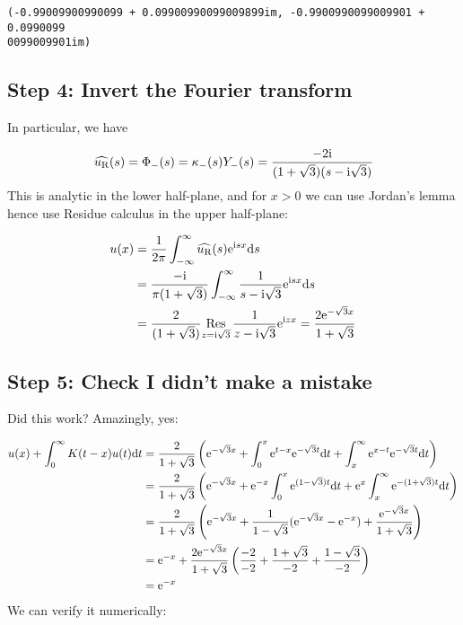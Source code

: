 \documentclass[12pt,a4paper]{article}
\def\D{ {\rm d} }
\def\I{ {\rm i} }
\def\E{ {\rm e} }
\def\Res_#1{\underset{#1}{\rm Res}\,}
\def\dt{\D t}
\def\ds{\D s}
\begin{document}
\begin{lstlisting}
(-0.99009900990099 + 0.09900990099009899im, -0.9900990099009901 + 0.0990099
0099009901im)
\end{lstlisting}


\subsection{Step 4: Invert the Fourier transform}
In particular, we have

\[
\widehat{u_{\rm R}}(s) = \Phi_-(s) = \kappa_-(s) Y_-(s) =  {-2 \I \over (1+\sqrt{3})(s-\I \sqrt 3)}
\]
This is analytic in the lower half-plane, and for $x > 0$ we can use Jordan's lemma hence use Residue calculus in the upper half-plane:


\begin{align*}
u(x) &= {1 \over 2 \pi} \int_{-\infty}^\infty \widehat{u_{\rm R}}(s) \E^{\I s x} \ds  \\
&= {-\I \over \pi(1+\sqrt{3})} \int_{-\infty}^\infty {1 \over s-\I \sqrt 3} \E^{\I s x} \ds  \\
&= {2   \over (1+\sqrt{3})} \Res_{z=\I \sqrt 3} {1 \over z-\I \sqrt 3} \E^{\I z x}  =
{2 \E^{-\sqrt{3}x}    \over 1+\sqrt{3}}
\end{align*}
\subsection{Step 5: Check I didn't make a mistake}
Did this work? Amazingly, yes:


\begin{align*}
u(x) + \int_0^\infty K(t -x) u(t) \dt &= {2   \over 1+\sqrt{3}} \left(  \E^{-\sqrt{3}x}  +   \int_0^x \E^{t-x} \E^{-\sqrt{3}t} \dt +  \int_x^\infty \E^{x-t} \E^{-\sqrt{3}t}\dt \right) \\
&={2    \over 1+\sqrt{3}}\left( \E^{-\sqrt{3}x}   +  \E^{-x}    \int_0^x \E^{(1-\sqrt{3})t} \dt + \E^x  \int_x^\infty  \E^{-(1+\sqrt{3})t}\dt \right) \\
&={2     \over 1+\sqrt{3}}\left( \E^{-\sqrt{3}x}  + {1  \over 1-\sqrt 3}   (\E^{-\sqrt{3}x} - \E^{-x}) + { \E^{-\sqrt 3 x } \over 1+\sqrt{3}} \right) \\
&=\E^{-x} + {2  \E^{-\sqrt{3}x}   \over 1+\sqrt{3}}\left({-2 \over -2}   + {1+ \sqrt 3  \over -2} + {1 - \sqrt 3 \over -2} \right)  \\
&= \E^{-x}
\end{align*}
We can verify it numerically:
\end{document}
